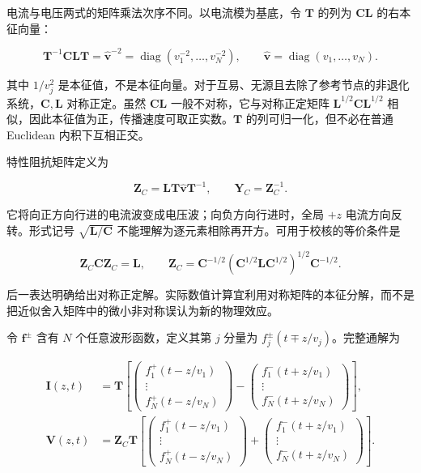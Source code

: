 \documentclass[
  11pt,
  a4paper,
  oneside,
  openany]{report}
\numberwithin{equation}{chapter}
\begin{document}
电流与电压两式的矩阵乘法次序不同。以电流模为基底，令 \(\mathbf T\)
的列为 \(\mathbf C\mathbf L\) 的右本征向量：

\nopagebreak[3]
\begin{equation}
\mathbf T^{-1}\mathbf C\mathbf L\mathbf T
=\widehat{\mathbf v}^{-2}
=\operatorname{diag}(v_1^{-2},\ldots,v_N^{-2}),
\qquad \widehat{\mathbf v}=\operatorname{diag}(v_1,\ldots,v_N).
\end{equation}

其中 \(1/v_j^2\)
是本征值，不是本征向量。对于互易、无源且去除了参考节点的非退化系统，\(\mathbf C,\mathbf L\)
对称正定。虽然 \(\mathbf C\mathbf L\) 一般不对称，它与对称正定矩阵
\(\mathbf L^{1/2}\mathbf C\mathbf L^{1/2}\)
相似，因此本征值为正，传播速度可取正实数。\(\mathbf T\)
的列可归一化，但不必在普通 Euclidean 内积下互相正交。

特性阻抗矩阵定义为

\nopagebreak[3]
\begin{equation}
\mathbf Z_C=\mathbf L\mathbf T\widehat{\mathbf v}\mathbf T^{-1},
\qquad \mathbf Y_C=\mathbf Z_C^{-1}.
\end{equation}

它将向正方向行进的电流波变成电压波；向负方向行进时，全局 \(+z\)
电流方向反转。形式记号 \(\sqrt{\mathbf L/\mathbf C}\)
不能理解为逐元素相除再开方。可用于校核的等价条件是

\nopagebreak[3]
\begin{equation}
\mathbf Z_C\mathbf C\mathbf Z_C=\mathbf L,
\qquad
\mathbf Z_C=\mathbf C^{-1/2}
\left(\mathbf C^{1/2}\mathbf L\mathbf C^{1/2}\right)^{1/2}\mathbf C^{-1/2}.
\end{equation}

后一表达明确给出对称正定解。实际数值计算宜利用对称矩阵的本征分解，而不是把近似舍入矩阵中的微小非对称误认为新的物理效应。

令 \(\mathbf f^\pm\) 含有 \(N\) 个任意波形函数，定义其第 \(j\) 分量为
\(f_j^\pm(t\mp z/v_j)\)。完整通解为

\nopagebreak[3]
\begin{equation}
\begin{aligned}
\mathbf I(z,t)&=\mathbf T
\left[\begin{pmatrix}f_1^+(t-z/v_1)\\ \vdots\\ f_N^+(t-z/v_N)\end{pmatrix}
-\begin{pmatrix}f_1^-(t+z/v_1)\\ \vdots\\ f_N^-(t+z/v_N)\end{pmatrix}\right],\\
\mathbf V(z,t)&=\mathbf Z_C\mathbf T
\left[\begin{pmatrix}f_1^+(t-z/v_1)\\ \vdots\\ f_N^+(t-z/v_N)\end{pmatrix}
+\begin{pmatrix}f_1^-(t+z/v_1)\\ \vdots\\ f_N^-(t+z/v_N)\end{pmatrix}\right].
\end{aligned}
\end{equation}
\end{document}

